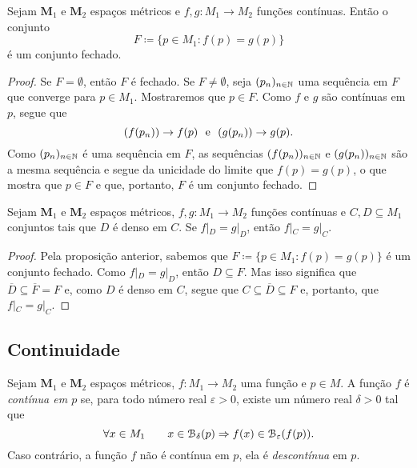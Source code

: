 \begin{prop}
	Sejam $\bm M_1$ e $\bm M_2$ espaços métricos e $f,g: M_1 \to M_2$ funções contínuas. Então o conjunto 
	\begin{equation*}
	F \coloneqq \{p \in M_1 : f(p)=g(p)\}
	\end{equation*}
é um conjunto fechado.
\end{prop}
\begin{proof}
	Se $F=\emptyset$, então $F$ é fechado. Se $F \neq \emptyset$, seja $(p_n)_{n \in \mathbb{N}}$ uma sequência em $F$ que converge para $p \in M_1$. Mostraremos que $p \in F$. Como $f$ e $g$ são contínuas em $p$, segue que
	\begin{equation*}
	(f(p_n)) \rightarrow f(p) \text{\ \ e\ \ } (g(p_n)) \rightarrow g(p).
	\end{equation*}
	Como $(p_n)_{n \in \mathbb{N}}$ é uma sequência em $F$, as sequências $(f(p_n))_{n \in \mathbb{N}}$ e $(g(p_n))_{n \in \mathbb{N}}$ são a mesma sequência e segue da unicidade do limite que $f(p)=g(p)$, o que mostra que $p \in F$ e que, portanto, $F$ é um conjunto fechado.
\end{proof}

\begin{prop}
	Sejam $\bm M_1$ e $\bm M_2$ espaços métricos, $f,g: M_1 \to M_2$ funções contínuas e $C,D \subseteq M_1$ conjuntos tais que $D$ é denso em $C$. Se $f|_D = g|_D$, então $f|_C = g|_C$.
\end{prop}
\begin{proof}
	Pela proposição anterior, sabemos que $F \coloneqq \{p \in M_1 : f(p)=g(p)\}$ é um conjunto fechado. Como $f|_D = g|_D$, então $D \subseteq F$. Mas isso significa que $\overline D \subseteq \overline F = F$ e, como $D$ é denso em $C$, segue que $C \subseteq \overline D \subseteq F$ e, portanto, que $f|_C = g|_C$. 
\end{proof}

\subsection{Continuidade}

\begin{defi}
Sejam $\bm M_1$ e $\bm M_2$ espaços métricos, $f: M_1 \to M_2$ uma função e $p \in M$. A função $f$ é \emph{contínua em $p$} se, para todo número real $\varepsilon > 0$, existe um número real $\delta > 0$ tal que
	\begin{equation*}
	\forall x \in M_1 \qquad x \in \mathcal{B}_\delta(p) \Rightarrow f(x) \in \mathcal{B}_\varepsilon(f(p)).
	\end{equation*}
Caso contrário, a função $f$ não é contínua em $p$, ela é \emph{descontínua} em $p$.
\end{defi}

